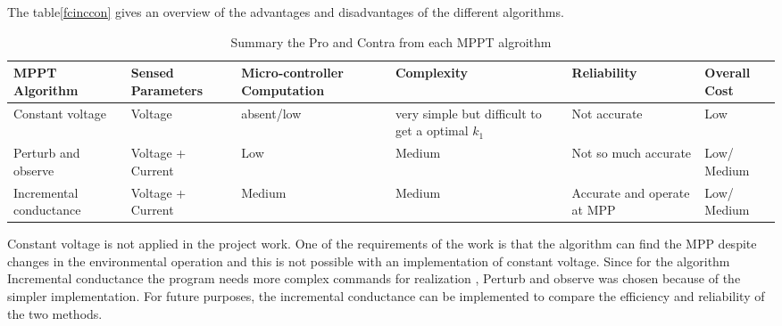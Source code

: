 The table\ref{fcinccon} gives an overview of the advantages and disadvantages of the different algorithms.
\begin{table}[H]
	\centering 
		\begin{tabular}{|>{\centering}p{2cm}|>{\centering}p{2cm}|>{\centering}p{2cm}|>{\centering}p{2cm}|>{\centering}p{2cm}|>{\centering}p{2cm}|}
		\hline
		\rowcolor{lightgray}						 \textbf{MPPT Algorithm} & 	
		 \textbf{Sensed Parameters} &
		\textbf{Micro-controller Computation} &
		 \textbf{Complexity}&
		 \textbf{Reliability}	&
		 \textbf{Overall Cost}
		\tabularnewline  \hline
			Constant voltage 	& Voltage 		& absent/low &  very simple but difficult to get a optimal $k_{1}$& Not accurate & Low 										\tabularnewline \hline
			Perturb and observe & Voltage + Current  & Low  &  Medium & Not so much accurate & Low/ Medium 		\tabularnewline \hline
			Incremental conductance & Voltage + Current & Medium &  Medium & Accurate and operate at MPP & Low/ Medium	\tabularnewline	\hline
		
		\end{tabular}
	\caption{Summary the Pro and Contra from each MPPT algroithm \cite{flowchartVC} }
	\label{tab:summaryMPPT}
\end{table}
Constant voltage is not applied in the project work. One of the requirements of the work is that the algorithm can find the MPP despite changes in the environmental operation and this is not possible with an implementation of constant voltage. Since for the algorithm Incremental conductance the program needs more complex commands for realization , Perturb and observe was chosen because of the simpler implementation. For future purposes, the incremental conductance can be implemented to compare the efficiency and reliability of the two methods.



